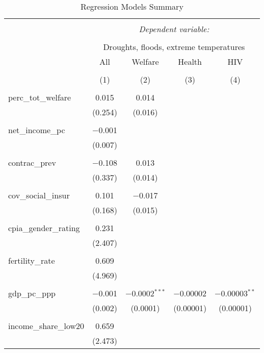 
\begin{table}[!htbp] \centering 
  \caption{Regression Models Summary} 
  \label{} 
\begin{tabular}{@{\extracolsep{5pt}}lcccc} 
\\[-1.8ex]\hline 
\hline \\[-1.8ex] 
 & \multicolumn{4}{c}{\textit{Dependent variable:}} \\ 
\cline{2-5} 
\\[-1.8ex] & \multicolumn{4}{c}{Droughts, floods, extreme temperatures} \\ 
 & All & Welfare & Health & HIV \\ 
\\[-1.8ex] & (1) & (2) & (3) & (4)\\ 
\hline \\[-1.8ex] 
 perc\_tot\_welfare & 0.015 & 0.014 &  &  \\ 
  & (0.254) & (0.016) &  &  \\ 
  & & & & \\ 
 net\_income\_pc & $-$0.001 &  &  &  \\ 
  & (0.007) &  &  &  \\ 
  & & & & \\ 
 contrac\_prev & $-$0.108 & 0.013 &  &  \\ 
  & (0.337) & (0.014) &  &  \\ 
  & & & & \\ 
 cov\_social\_insur & 0.101 & $-$0.017 &  &  \\ 
  & (0.168) & (0.015) &  &  \\ 
  & & & & \\ 
 cpia\_gender\_rating & 0.231 &  &  &  \\ 
  & (2.407) &  &  &  \\ 
  & & & & \\ 
 fertility\_rate & 0.609 &  &  &  \\ 
  & (4.969) &  &  &  \\ 
  & & & & \\ 
 gdp\_pc\_ppp & $-$0.001 & $-$0.0002$^{***}$ & $-$0.00002 & $-$0.00003$^{**}$ \\ 
  & (0.002) & (0.0001) & (0.00001) & (0.00001) \\ 
  & & & & \\ 
 income\_share\_low20 & 0.659 &  &  &  \\ 
  & (2.473) &  &  &  \\ 

\end{tabular}
\end{table}
